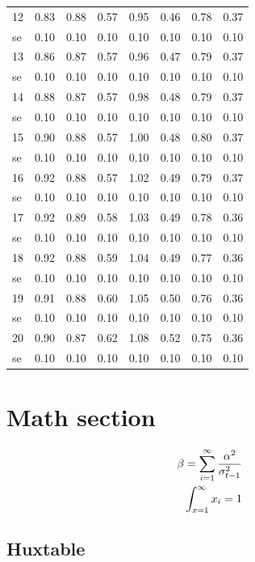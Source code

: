 \documentclass[11pt,preprint, authoryear]{elsarticle}
\numberwithin{equation}{section}
\numberwithin{figure}{section}
\numberwithin{table}{section}
\begin{document}
\begin{longtable}{lrrrrrrr}
  12 & 0.83 & 0.88 & 0.57 & 0.95 & 0.46 & 0.78 & 0.37 \\ 
  se & 0.10 & 0.10 & 0.10 & 0.10 & 0.10 & 0.10 & 0.10 \\ 
  13 & 0.86 & 0.87 & 0.57 & 0.96 & 0.47 & 0.79 & 0.37 \\ 
  se & 0.10 & 0.10 & 0.10 & 0.10 & 0.10 & 0.10 & 0.10 \\ 
  14 & 0.88 & 0.87 & 0.57 & 0.98 & 0.48 & 0.79 & 0.37 \\ 
  se & 0.10 & 0.10 & 0.10 & 0.10 & 0.10 & 0.10 & 0.10 \\ 
  15 & 0.90 & 0.88 & 0.57 & 1.00 & 0.48 & 0.80 & 0.37 \\ 
  se & 0.10 & 0.10 & 0.10 & 0.10 & 0.10 & 0.10 & 0.10 \\ 
  16 & 0.92 & 0.88 & 0.57 & 1.02 & 0.49 & 0.79 & 0.37 \\ 
  se & 0.10 & 0.10 & 0.10 & 0.10 & 0.10 & 0.10 & 0.10 \\ 
  17 & 0.92 & 0.89 & 0.58 & 1.03 & 0.49 & 0.78 & 0.36 \\ 
  se & 0.10 & 0.10 & 0.10 & 0.10 & 0.10 & 0.10 & 0.10 \\ 
  18 & 0.92 & 0.88 & 0.59 & 1.04 & 0.49 & 0.77 & 0.36 \\ 
  se & 0.10 & 0.10 & 0.10 & 0.10 & 0.10 & 0.10 & 0.10 \\ 
  19 & 0.91 & 0.88 & 0.60 & 1.05 & 0.50 & 0.76 & 0.36 \\ 
  se & 0.10 & 0.10 & 0.10 & 0.10 & 0.10 & 0.10 & 0.10 \\ 
  20 & 0.90 & 0.87 & 0.62 & 1.08 & 0.52 & 0.75 & 0.36 \\ 
  se & 0.10 & 0.10 & 0.10 & 0.10 & 0.10 & 0.10 & 0.10 \\ 
   \bottomrule
\end{longtable}
\endgroup

\hypertarget{math-section}{%
\section{Math section}\label{math-section}}

\begin{align}
\beta = \sum_{i = 1}^{\infty}\frac{\alpha^2}{\sigma_{t-1}^2} \label{eq1} \\
\int_{x = 1}^{\infty}x_{i} = 1 \notag
\end{align}

\hfill

\hypertarget{huxtable}{%
\subsection{Huxtable}\label{huxtable}}
\end{document}
